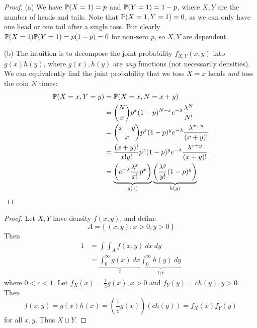 \documentclass[a4paper]{article}
\begin{document}
\begin{proof}[Proof] 
(a) We have \(\mathbb{P}(X=1) = p\) and \(\mathbb{P}(Y=1) = 1-p\), where \(X,Y\) are the number of heads and tails. Note that \(\mathbb{P}(X=1,Y=1) = 0\), as we can only have one head or one tail after a single toss. But clearly \(\mathbb{P}(X=1)\mathbb{P}(Y=1) = p(1-p) = 0\) for non-zero \(p\), so \(X, Y\) are dependent.
\vspace{12pt}
\par (b) The intuition is to decompose the joint probability \(f_{X,Y}(x,y)\) into \(g(x)h(y)\), where \(g(x), h(y)\) are \textit{any} functions (not necessarily densities). We can equivalently find the joint probability that we toss \(X = x\) heads \textit{and} toss the coin \(N\) times:
\begin{align*}
	\mathbb{P}(X = x, Y = y) & = \mathbb{P}(X = x, N = x+y) \\
			    & = \binom{N}{x} p^{x}(1-p)^{N-x}e^{-\lambda} \frac{\lambda^{N}}{N!} \\
			    & = \binom{x+y}{x} p^{x}(1-p)^{y} e^{-\lambda} \frac{\lambda^{x+y}}{(x+y)!} \\
			    & = \frac{(x+y)!}{x!y!} p^{x}(1-p)^{y}e^{-\lambda} \frac{\lambda^{x+y}}{(x+y)!} \\
			    & = \underbrace{\left(e^{-\lambda} \frac{\lambda^{x}}{x!}p^{x}  \right)}_{g(x)} \underbrace{\left( \frac{\lambda^{y}}{y!} (1-p)^{y} \right) }_{h(y)} 
\end{align*}
\end{proof}

\newpage
\begin{proof}[Proof] 
Let \(X, Y\) have density \(f(x,y)\), and define
\[
	A = \{\,(x,y) \colon x > 0, y > 0 \,\}
\]
Then
\begin{align*}
	1 & = \int \int_{A} f(x,y)  \ dx  \ dy  \\
	  & = \underbrace{\int^{\infty}_{0} g(x) \ dx}_{c} \underbrace{\int^{\infty}_{0} h(y) \ dy }_{1/c}
\end{align*}
where \(0 < c < 1\). Let \(f_{X}(x) = \frac{1}{c} g(x), x > 0\) and \(f_{Y}(y) = ch(y), y > 0\). Then
\[
	f(x,y) = g(x)h(x) = \left( \frac{1}{c} g(x) \right) \left( c h(y) \right) = f_{X}(x) f_{Y}(y)
\]
for all \(x, y\). Thus \(X \sqcup Y\).
\end{proof}
\end{document}
